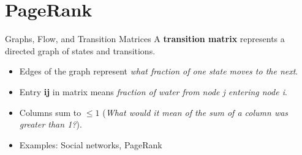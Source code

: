 \section{PageRank}
\begin{frame}{Graphs, Flow, and Transition Matrices}
    A \textbf{transition matrix} represents a directed graph of states and transitions.
    \begin{itemize}
        \item Edges of the graph represent \textit{what fraction of one state moves to the next}.
        \item Entry \textbf{ij} in matrix means \textit{fraction of water from node j entering node i}. 
        \item Columns sum to $\leq 1$ (\textit{What would it mean of the sum of a column was greater than 1?}).
        \item Examples: Social networks, PageRank
    \end{itemize}
\end{frame}

